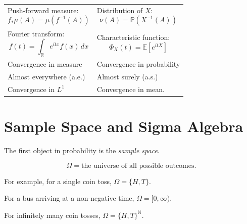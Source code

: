 \begin{table}[H]
\begin{tabularx}{\textwidth}{
        >{\raggedright\arraybackslash}X
        >{\raggedright\arraybackslash}X
    }
        \\[1ex]

        Push-forward measure:
        \[
        f_*\mu(A)
        =
        \mu\left(f^{-1}(A)\right)
        \]
        &
        Distribution of $X$:
        \[
        \nu(A)
        =
        \mathbb{P}\left(X^{-1}(A)\right)
        \]

        \\[1ex]

        Fourier transform:
        \[
        \widehat{f}(t)
        =
        \int_{\mathbb{R}}
        e^{itx}f(x)\,dx
        \]
        &
        Characteristic function:
        \[
        \Phi_X(t)
        =
        \mathbb{E}\left[e^{itX}\right]
        \]

        \\[1ex]

        Convergence in measure
        &
        Convergence in probability

        \\[1ex]

        Almost everywhere (a.e.)
        &
        Almost surely (a.s.)

        \\[1ex]

        Convergence in $L^1$
        &
        Convergence in mean.

        \\

        \hline

    \end{tabularx}
\end{table}


\section{Sample Space and Sigma Algebra}

The first object in probability is the \emph{sample space}.

\[
\Omega
=
\text{the universe of all possible outcomes}.
\]

For example, for a single coin toss,
\(
\Omega=\{H,T\}.
\)

For a bus arriving at a non-negative time,
\(
\Omega=[0,\infty).
\)

For infinitely many coin tosses,
\(
\Omega=\{H,T\}^{\mathbb{N}}.
\)

